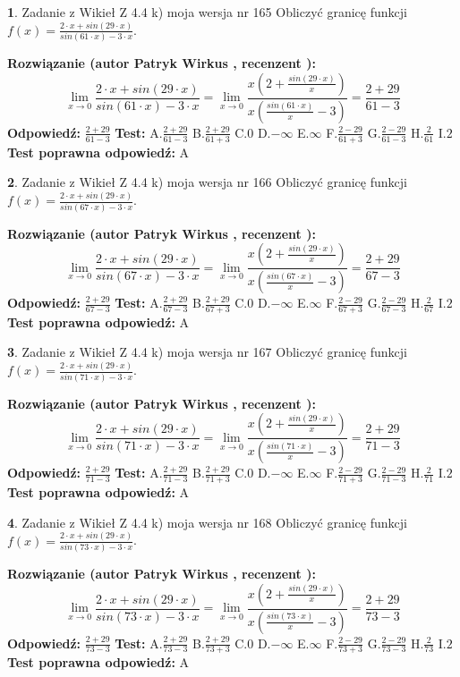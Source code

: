 \documentclass[12pt, a4paper]{article}
\theoremstyle{definition} %
\newtheorem{zad}{}
\newcommand{\zadStart}[1]{\begin{zad}#1\newline}
\newcommand{\zadStop}{\end{zad}}
\newcommand{\rozwStart}[2]{\noindent \textbf{Rozwiązanie (autor #1 , recenzent #2): }\newline}
\newcommand{\rozwStop}{\newline}
\newcommand{\odpStart}{\noindent \textbf{Odpowiedź:}\newline}
\newcommand{\odpStop}{\newline}
\newcommand{\testStart}{\noindent \textbf{Test:}\newline}
\newcommand{\testStop}{\newline}
\newcommand{\kluczStart}{\noindent \textbf{Test poprawna odpowiedź:}\newline}
\newcommand{\kluczStop}{\newline}
\begin{document}
\zadStart{Zadanie z Wikieł Z 4.4 k) moja wersja nr 165}
Obliczyć granicę funkcji $f(x)=\frac{2\cdot x +sin(29\cdot x)}{sin(61\cdot x) -3\cdot x}$.
\zadStop
\rozwStart{Patryk Wirkus}{}
$$\lim\limits_{x\to 0}\frac{2\cdot x +sin(29\cdot x)}{sin(61\cdot x) -3\cdot x}
=\lim\limits_{x\to 0}\frac{x(2+\frac{sin(29\cdot x)}{x})}{x(\frac{sin(61\cdot x)}{x}-3)}
=\frac{2+29}{61-3}$$
\rozwStop
\odpStart
$\frac{2+29}{61-3}$
\odpStop
\testStart
A.$\frac{2+29}{61-3}$
B.$\frac{2+29}{61+3}$
C.$0$
D.$-\infty$
E.$\infty$
F.$\frac{2-29}{61+3}$
G.$\frac{2-29}{61-3}$
H.$\frac{2}{61}$
I.$2$
\testStop
\kluczStart
A
\kluczStop



\zadStart{Zadanie z Wikieł Z 4.4 k) moja wersja nr 166}
Obliczyć granicę funkcji $f(x)=\frac{2\cdot x +sin(29\cdot x)}{sin(67\cdot x) -3\cdot x}$.
\zadStop
\rozwStart{Patryk Wirkus}{}
$$\lim\limits_{x\to 0}\frac{2\cdot x +sin(29\cdot x)}{sin(67\cdot x) -3\cdot x}
=\lim\limits_{x\to 0}\frac{x(2+\frac{sin(29\cdot x)}{x})}{x(\frac{sin(67\cdot x)}{x}-3)}
=\frac{2+29}{67-3}$$
\rozwStop
\odpStart
$\frac{2+29}{67-3}$
\odpStop
\testStart
A.$\frac{2+29}{67-3}$
B.$\frac{2+29}{67+3}$
C.$0$
D.$-\infty$
E.$\infty$
F.$\frac{2-29}{67+3}$
G.$\frac{2-29}{67-3}$
H.$\frac{2}{67}$
I.$2$
\testStop
\kluczStart
A
\kluczStop



\zadStart{Zadanie z Wikieł Z 4.4 k) moja wersja nr 167}
Obliczyć granicę funkcji $f(x)=\frac{2\cdot x +sin(29\cdot x)}{sin(71\cdot x) -3\cdot x}$.
\zadStop
\rozwStart{Patryk Wirkus}{}
$$\lim\limits_{x\to 0}\frac{2\cdot x +sin(29\cdot x)}{sin(71\cdot x) -3\cdot x}
=\lim\limits_{x\to 0}\frac{x(2+\frac{sin(29\cdot x)}{x})}{x(\frac{sin(71\cdot x)}{x}-3)}
=\frac{2+29}{71-3}$$
\rozwStop
\odpStart
$\frac{2+29}{71-3}$
\odpStop
\testStart
A.$\frac{2+29}{71-3}$
B.$\frac{2+29}{71+3}$
C.$0$
D.$-\infty$
E.$\infty$
F.$\frac{2-29}{71+3}$
G.$\frac{2-29}{71-3}$
H.$\frac{2}{71}$
I.$2$
\testStop
\kluczStart
A
\kluczStop



\zadStart{Zadanie z Wikieł Z 4.4 k) moja wersja nr 168}
Obliczyć granicę funkcji $f(x)=\frac{2\cdot x +sin(29\cdot x)}{sin(73\cdot x) -3\cdot x}$.
\zadStop
\rozwStart{Patryk Wirkus}{}
$$\lim\limits_{x\to 0}\frac{2\cdot x +sin(29\cdot x)}{sin(73\cdot x) -3\cdot x}
=\lim\limits_{x\to 0}\frac{x(2+\frac{sin(29\cdot x)}{x})}{x(\frac{sin(73\cdot x)}{x}-3)}
=\frac{2+29}{73-3}$$
\rozwStop
\odpStart
$\frac{2+29}{73-3}$
\odpStop
\testStart
A.$\frac{2+29}{73-3}$
B.$\frac{2+29}{73+3}$
C.$0$
D.$-\infty$
E.$\infty$
F.$\frac{2-29}{73+3}$
G.$\frac{2-29}{73-3}$
H.$\frac{2}{73}$
I.$2$
\testStop
\kluczStart
A
\kluczStop
\end{document}
